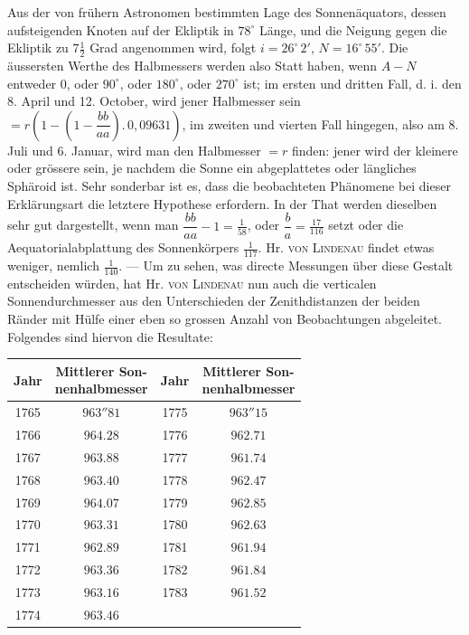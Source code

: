 Aus der von frühern Astronomen bestimmten Lage des Sonnenäquators, dessen aufsteigenden Knoten auf der Ekliptik in $78^\circ$ Länge, und die Neigung gegen die Ekliptik zu $7\tfrac{1}{2}$ Grad angenommen wird, folgt $i = 26^\circ \, 2'$, $N = 16^\circ \, 55'$. Die äussersten Werthe des Halbmessers werden also Statt haben, wenn $A-N$ entweder $0$, oder $90^\circ$, oder $180^\circ$, oder $270^\circ$ ist; im ersten und dritten Fall, d. i. den 8. April und 12. October, wird jener Halbmesser sein $= r\left(1-\left(1-\dfrac{bb}{aa}\right).\,0{,}09631\right)$, im zweiten und vierten Fall hingegen, also am 8. Juli und 6. Januar, wird man den Halbmesser $= r$ finden: jener wird der kleinere oder grössere sein, je nachdem die Sonne ein abgeplattetes oder längliches Sphäroid ist. Sehr sonderbar ist es, dass die beobachteten Phänomene bei dieser Erklärungsart die letztere Hypothese erfordern. In der That werden dieselben sehr gut dargestellt, wenn man $\dfrac{bb}{aa}-1 = \tfrac{1}{58}$, oder $\dfrac{b}{a} = \tfrac{17}{116}$ setzt oder die Aequatorialabplattung des Sonnenkörpers $\tfrac{1}{117}$. Hr. \textsc{von Lindenau} findet etwas weniger, nemlich $\tfrac{1}{140}$. — Um zu sehen, was directe Messungen über diese Gestalt entscheiden würden, hat Hr. \textsc{von Lindenau} nun auch die verticalen Sonnendurchmesser aus den Unterschieden der Zenithdistanzen der beiden Ränder mit Hülfe einer eben so grossen Anzahl von Beobachtungen abgeleitet. Folgendes sind hiervon die Resultate:

\begin{center}\begin{tabular}{c|c||c|c}
Jahr & \shortstack{Mittlerer Son-\\nenhalbmesser} & Jahr & \shortstack{Mittlerer Son-\\nenhalbmesser} \\ \hline
1765 & $963''81$ & 1775 & $963''15$ \\
1766 & $964.28$ & 1776 & $962.71$ \\
1767 & $963.88$ & 1777 & $961.74$ \\
1768 & $963.40$ & 1778 & $962.47$ \\
1769 & $964.07$ & 1779 & $962.85$ \\
1770 & $963.31$ & 1780 & $962.63$ \\
1771 & $962.89$ & 1781 & $961.94$ \\
1772 & $963.36$ & 1782 & $961.84$ \\
1773 & $963.16$ & 1783 & $961.52$ \\
1774 & $963.46$ & & \\
\end{tabular}\end{center}

